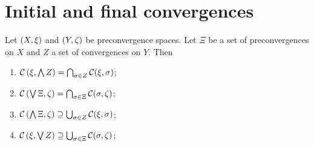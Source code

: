 \section{Initial and final convergences}
\begin{proposition} \label{continuityUnderConvergenceLatticeOperations}
Let $\sSet{X,\xi}$ and $\sSet{Y,\zeta}$ be preconvergence spaces. Let $\Xi$ be a set of preconvergences on $X$ and $Z$ a set of convergences on $Y$. Then
\begin{enumerate}
\item $\operatorname{\mathcal{C}}\left(\xi, \bigwedge Z\right) = \bigcap_{\sigma\in Z} \operatorname{\mathcal{C}}(\xi, \sigma)$;
\item $\operatorname{\mathcal{C}}\left(\bigvee \Xi, \zeta\right) = \bigcap_{\sigma\in \Xi} \operatorname{\mathcal{C}}(\sigma, \zeta)$;
\item $\operatorname{\mathcal{C}}\left(\bigwedge \Xi, \zeta\right) \supseteq \bigcup_{\sigma\in Z} \operatorname{\mathcal{C}}(\xi, \sigma)$;
\item $\operatorname{\mathcal{C}}\left(\xi, \bigvee Z\right) \supseteq \bigcup_{\sigma\in \Xi} \operatorname{\mathcal{C}}(\sigma, \zeta)$;
\end{enumerate}
\end{proposition}
